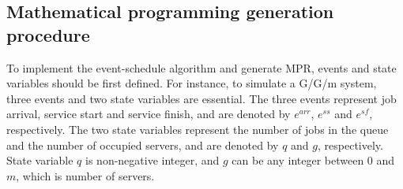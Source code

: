 \documentclass[]{interact}
\theoremstyle{plain}%
\theoremstyle{definition}
\theoremstyle{remark}
\begin{document}

\subsection{Mathematical programming generation procedure} \label{sec:MPR_procedure}

To implement the event-schedule algorithm and generate MPR, events and state variables should be first defined. For instance, to simulate a G/G/m system, three events and two state variables are essential. The three events represent job arrival, service start and service finish, and are denoted by $e^{arr}$, $e^{ss}$ and $e^{sf}$, respectively. The two state variables represent the number of jobs in the queue and the number of occupied servers, and are denoted by $q$ and $g$, respectively. State variable $q$ is non-negative integer, and $g$ can be any integer between $0$ and $m$, which is number of servers. 
\end{document}
